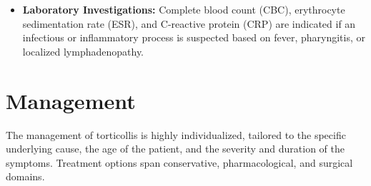 \begin{itemize}
\begin{itemize}
        \item \textit{Cervical Spine Radiography (X-rays):} Standard anteroposterior (AP), lateral, and open-mouth (odontoid) views are indicated in patients with a history of trauma, acute onset without muscle spasm, or suspected bony anomalies. X-rays are useful to identify cervical vertebrae fusion (Klippel-Feil syndrome), hemivertebrae, osteomyelitis, or atlantoaxial subluxation.
        \item \textit{Computed Tomography (CT) Scanning:} CT provides detailed resolution of bony structures and is the diagnostic tool of choice for demonstrating atlantoaxial rotatory subluxation (AARS). Contrast-enhanced CT is also invaluable for diagnosing deep neck space infections like retropharyngeal abscesses.
        \item \textit{Magnetic Resonance Imaging (MRI):} Indicated if there are signs of central nervous system involvement, progressive neurological deficits, or when a posterior fossa/spinal cord tumor is suspected. MRI provides superior soft-tissue resolution of the brainstem, cerebellum, and spinal cord.
    \end{itemize}
    \item \textbf{Laboratory Investigations:} Complete blood count (CBC), erythrocyte sedimentation rate (ESR), and C-reactive protein (CRP) are indicated if an infectious or inflammatory process is suspected based on fever, pharyngitis, or localized lymphadenopathy.
\end{itemize}

\section*{Management}
The management of torticollis is highly individualized, tailored to the specific underlying cause, the age of the patient, and the severity and duration of the symptoms. Treatment options span conservative, pharmacological, and surgical domains.

